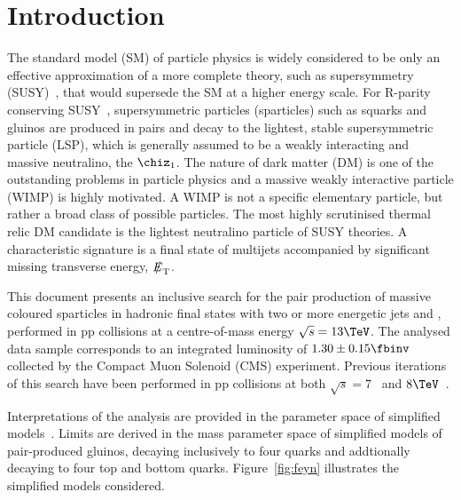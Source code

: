 \section{Introduction}
\label{sec:introduction}

The standard model (SM) of particle physics is widely considered to be
only an effective approximation of a more complete theory, such as
supersymmetry (SUSY)~\cite{ref:SUSY-1,ref:SUSY0,ref:SUSY1,ref:SUSY2,ref:SUSY3,ref:SUSY4,ref:hierarchy1,ref:hierarchy2},
that would supersede the SM at a higher energy scale. For R-parity conserving
SUSY~\cite{Farrar:1978xj}, supersymmetric particles (sparticles) such
as squarks and gluinos are produced in pairs and decay to the
lightest, stable supersymmetric particle (LSP), which is generally
assumed to be a weakly interacting and massive neutralino, the $\chiz_1$. 
The nature of dark matter (DM) is one of the outstanding problems in particle physics and a massive weakly interactive particle (WIMP) is highly motivated. A WIMP is not a specific elementary particle, but rather a broad class of possible particles. The most highly scrutinised thermal relic DM candidate is the lightest neutralino particle of SUSY theories.
A characteristic signature is a final state of multijets accompanied by
significant missing transverse energy, $\met$.

This document presents an inclusive search for the pair production of
massive coloured sparticles in hadronic final states with two or more
energetic jets and \met, performed in pp collisions at a
centre-of-mass energy $\sqrt{s} = 13\TeV$. The analysed data sample
corresponds to an integrated luminosity of $1.30 \pm 0.15 \fbinv$~\cite{lumi} collected by the Compact Muon Solenoid (CMS)
experiment. Previous iterations of this search have been performed in
pp collisions at both $\sqrt{s} = 7$~\cite{RA1Paper, RA1Paper2011, RA1Paper2011FULL} and $8\TeV$~\cite{RA1Paper2012}.

Interpretations of the analysis are provided in the parameter space of simplified models~\cite{Alwall:2008ag, Alwall:2008va, sms}. Limits are derived in the mass parameter space of simplified models of pair-produced gluinos, decaying inclusively to four quarks and addtionally decaying to four top and bottom quarks. Figure~\ref{fig:feyn} illustrates the simplified models considered.

